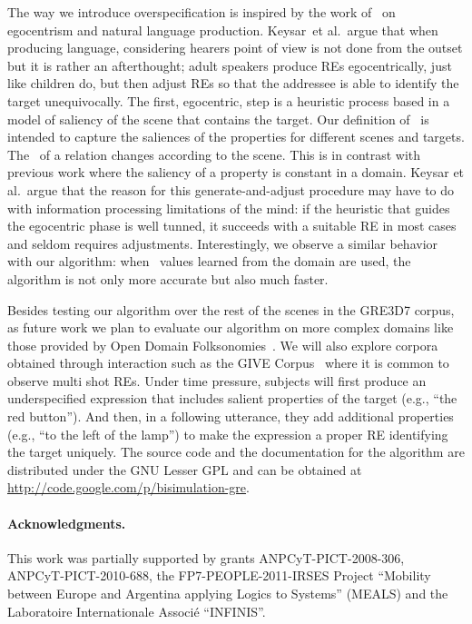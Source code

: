 The way we introduce overspecification is inspired by the work of~ on egocentrism and natural language production.  Keysar~et al.\ argue that when producing language, considering hearers point of view is not done from the outset but it is rather an afterthought; adult speakers produce REs egocentrically, just like children do, but then adjust REs so that the addressee is able to identify the target unequivocally. The first, egocentric, step is a heuristic process based in a model of saliency of the scene that contains the target. 
Our definition of \puse\ is intended to capture the saliences of the properties for different scenes and targets. The \puse\ of a relation changes according to the scene. This is in contrast with previous work where the saliency of a property is constant in a domain. Keysar et al.~argue that the reason for this generate-and-adjust procedure may have to do with information processing limitations of the mind: if the heuristic that guides the egocentric phase is well tunned, it succeeds with a suitable RE in most cases and seldom requires adjustments. Interestingly, we observe a similar behavior with our algorithm: when \puse\ values learned from the domain are used, the algorithm is not only more accurate but also much faster. 

Besides testing our algorithm over the rest of the scenes in the GRE3D7 corpus, 
as future work we plan to evaluate our algorithm on more complex domains 
like those provided by Open Domain Folksonomies~\cite{pacheco-duboue-dominguez:2012:NAACL-HLT}. We will also 
explore corpora obtained through interaction
such as the GIVE Corpus~\cite{GarGarKolStr10} where it is common to observe multi shot REs. Under time pressure, subjects will first produce an underspecified expression that includes salient properties of the target (e.g., ``the red button'').  And then, in a following utterance, they add additional properties (e.g., ``to the left of the lamp'') to make the expression a proper RE  identifying the target uniquely. The source code and the documentation for the algorithm are distributed under the GNU Lesser GPL and can be obtained at \url{http://code.google.com/p/bisimulation-gre}.

\begin{small}
\paragraph{Acknowledgments.}
 This work was partially supported by grants ANPCyT-PICT-2008-306, ANPCyT-PICT-2010-688, the FP7-PEOPLE-2011-IRSES Project
``Mobility between Europe and Argentina applying Logics to Systems'' (MEALS)
and the Laboratoire Internationale Associ\'e ``INFINIS''.
\end{small}
